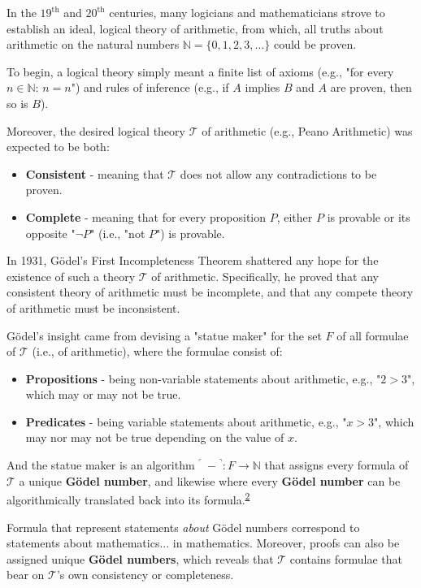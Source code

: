 In the $19^\text{th}$ and $20^\text{th}$ centuries, many logicians and mathematicians strove to establish an ideal, logical theory of arithmetic, from which, all truths about arithmetic on the natural numbers $\mathbb{N} = \{0,1,2,3,...\}$ could be proven.

To begin, a logical theory simply meant a finite list of axioms (e.g., "for every $n \in \mathbb{N}$: $n = n$") and rules of inference (e.g., if $A$ implies $B$ and $A$ are proven, then so is $B$).

Moreover, the desired logical theory $\mathcal{T}$ of arithmetic (e.g., Peano Arithmetic) was expected to be both:
\begin{itemize}
    \item \textbf{Consistent} - meaning that $\mathcal{T}$ does not allow any contradictions to be proven.
    \item \textbf{Complete} - meaning that for every proposition $P$, either $P$ is provable or its opposite "$\neg P$" (i.e., "not $P$") is provable.
\end{itemize}

In 1931, Gödel's First Incompleteness Theorem shattered any hope for the existence of such a theory $\mathcal{T}$ of arithmetic. Specifically, he proved that any consistent theory of arithmetic must be incomplete, and that any compete theory of arithmetic must be inconsistent.

Gödel's insight came from devising a "statue maker" for the set $F$ of all formulae of $\mathcal{T}$ (i.e., of arithmetic), where the formulae consist of:
\begin{itemize}
    \item \textbf{Propositions} - being non-variable statements about arithmetic, e.g., "$2 > 3$", which may or may not be true.
    \item \textbf{Predicates} - being variable statements about arithmetic, e.g., "$x > 3$", which may nor may not be true depending on the value of $x$.
\end{itemize}
And the statue maker is an algorithm ${}^\ulcorner\ - {}^\urcorner: F \rightarrow \mathbb{N}$ that assigns every formula of $\mathcal{T}$ a unique \textbf{Gödel number}, and likewise where every \textbf{Gödel number} can be algorithmically translated back into its formula.\textsuperscript{\href{#footnote-2}{2}}

Formula that represent statements \textit{about} Gödel numbers correspond to statements about mathematics... in mathematics. Moreover, proofs can also be assigned unique \textbf{Gödel numbers}, which reveals that $\mathcal{T}$ contains formulae that bear on $\mathcal{T}$'s own consistency or completeness.

